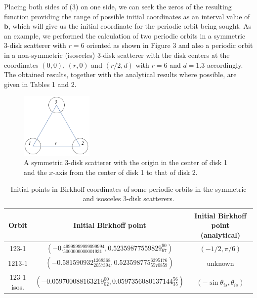\documentclass[pre, amsmath, amssymb, onecolumn, showpacs]{revtex4-1}
\begin{document}
Placing both sides of (3) on one side, we can seek the zeros of the resulting function providing the range of possible initial coordinates as an interval value of $\textbf{b}$, which will give us the initial coordinate for the periodic orbit being sought. As an example, we performed the calculation of two periodic orbits in a symmetric 3-disk scatterer with $r = 6$ oriented as shown in Figure 3 and also a periodic orbit in a non-symmetric (isosceles) 3-disk scatterer with the disk centers at the coordinates $(0, 0)$, $(r, 0)$ and $(r/2, d)$ with $r = 6$ and $d = 1.3$ accordingly. The obtained results, together with the analytical results where possible, are given in Tables 1 and 2.

\begin{figure}
\centering
\includegraphics*[width=100pt]{figure-3disks.pdf}
\caption{A symmetric 3-disk scatterer with the origin in the center of disk 1 and the $x$-axis from the center of disk 1 to that of disk 2.}
\label{fig03}
\end{figure}


\begin{table}[h!]
\centering
\begin{tabular}{||c c c ||} 
 \hline
 Orbit & Initial Birkhoff point & Initial Birkhoff point (analytical) \\ [0.5ex] 
 \hline\hline
 123-1 & $(-0._{5000000000001931}^{49999999999999994}, 0.52359877559829_{67}^{90})$ & $(-1/2, \pi/6)$ \\ [1ex] 
 1213-1 & $(-0.581590932_{2057394}^{1268368}, 0.523598775_{5570859}^{6395176})$ & unknown  \\ [1ex] 
 123-1 isos. & $(-0.059700088163219_{02}^{00}, 0.0597356080137144_{35}^{56})$ & $(-\sin \theta_{is}, \theta_{is})$ \\ [1ex]
 \hline
\end{tabular}
\caption{Initial points in Birkhoff coordinates of some periodic orbits in the symmetric and isosceles 3-disk scatterers.}
\label{table:1}
\end{table}
\end{document}
